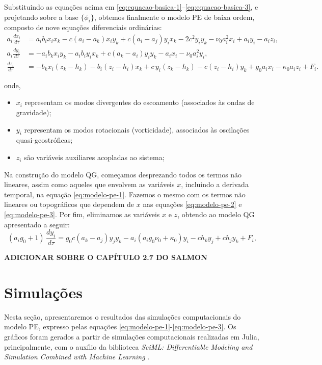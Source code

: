 Substituindo as equações acima em \eqref{eq:equacao-basica-1}–\eqref{eq:equacao-basica-3}, e projetando sobre a base $\{\phi_i\}$, obtemos finalmente o modelo PE de baixa ordem, composto de nove equações diferenciais ordinárias:
\begin{align}
    a_i\frac{dx_i}{d\tau} & = a_ib_ix_ix_k - c(a_i - a_k)x_iy_k      
	+ c(a_i - a_j)y_ix_k -2c^2y_iy_k - \nu_0a_i^2x_i + a_iy_i - a_iz_i, \label{eq:modelo-pe-1}\\
	a_i\frac{dy_i}{d\tau} & = -a_ib_kx_iy_k - a_ib_iy_ix_k           
	+ c(a_k - a_i)y_iy_k - a_ix_i - \nu_0a_i^2y_i, \label{eq:modelo-pe-2}\\
	\frac{dz_i}{d\tau}    & = -b_kx_i(z_k - h_k) - b_i(z_i - h_i)x_k 
	+ c\,y_i(z_k - h_k) - c(z_i - h_i)y_k + g_0a_ix_i - \kappa_0a_iz_i + F_i. \label{eq:modelo-pe-3}
\end{align}

onde,
\begin{itemize}
	\item $x_i$ representam os modos divergentes do escoamento (associados às ondas de gravidade);
	\item $y_i$ representam os modos rotacionais (vorticidade), associados às oscilações quasi-geostróficas;
	\item $z_i$ são variáveis auxiliares acopladas ao sistema;
\end{itemize}
Na construção do modelo QG, começamos desprezando todos os termos não lineares, assim como aqueles que envolvem as variáveis $x$, incluindo a derivada temporal, na equação \eqref{eq:modelo-pe-1}. Fazemos o mesmo com os termos não lineares ou topográficos que dependem de $x$ nas equações \eqref{eq:modelo-pe-2} e \eqref{eq:modelo-pe-3}. Por fim, eliminamos as variáveis $x$ e $z$, obtendo ao modelo QG apresentado a seguir:
\begin{equation}
	(a_i g_0 + 1)\,\frac{dy_i}{d\tau} 
	= g_0 c (a_k - a_j) y_j y_k 
	- a_i (a_i g_0 \nu_0 + \kappa_0) y_i 
	- c h_k y_j + c h_j y_k + F_i,
	\label{eq:modelo_lorenz_deterministico_qg}
\end{equation}

\textbf{ADICIONAR SOBRE O CAPÍTULO 2.7 DO SALMON}

\section{Simulações} \label{sec:ch01_simulacoes_deterministico}
Nesta seção, apresentaremos o resultados das simulações computacionais do modelo PE, expresso pelas equações \eqref{eq:modelo-pe-1}-\eqref{eq:modelo-pe-3}. Os gráficos foram gerados a partir de simulações computacionais realizadas em Julia, principalmente, com o auxílio da biblioteca \textit{SciML: Differentiable Modeling and Simulation Combined with Machine Learning} \citep{Rackauckas2017}. 

